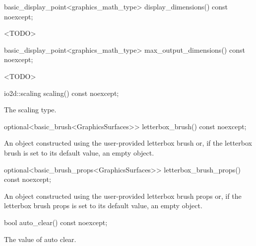 %
\begin{itemdecl}
basic_display_point<graphics_math_type> display_dimensions() const noexcept;
\end{itemdecl}
\begin{itemdescr}
\pnum
\returns
<TODO>
\end{itemdescr}

%
\begin{itemdecl}
basic_display_point<graphics_math_type> max_output_dimensions() const noexcept;
\end{itemdecl}
\begin{itemdescr}
\pnum
\returns
<TODO>
\end{itemdescr}

%
\begin{itemdecl}
io2d::scaling scaling() const noexcept;
\end{itemdecl}
\begin{itemdescr}
\pnum
\returns
The scaling type.
\end{itemdescr}

%
\begin{itemdecl}
optional<basic_brush<GraphicsSurfaces>> letterbox_brush() const noexcept;
\end{itemdecl}
\begin{itemdescr}
\pnum
\returns
An  object constructed using the user-provided letterbox brush or, if the letterbox brush is set to its default value, an empty  object.
\end{itemdescr}

%
\begin{itemdecl}
optional<basic_brush_props<GraphicsSurfaces>> letterbox_brush_props() const noexcept;
\end{itemdecl}
\begin{itemdescr}
\pnum
\returns
An  object constructed using the user-provided letterbox brush props or, if the letterbox brush props is set to its default value, an empty  object.
\end{itemdescr}

%
\begin{itemdecl}
bool auto_clear() const noexcept;
\end{itemdecl}
\begin{itemdescr}
\pnum
\returns
The value of auto clear.
\end{itemdescr}
